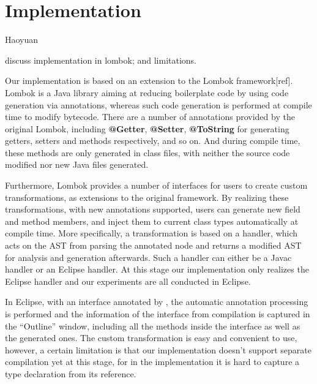 \section{Implementation}
Haoyuan

discuss implementation in lombok; and limitations.





Our implementation is based on an extension to the Lombok framework[ref]. Lombok is a Java library aiming at reducing boilerplate code by using code generation via annotations, whereas such code generation is performed at compile time to modify bytecode. There are a number of annotations provided by the original Lombok, including \textbf{@Getter}, \textbf{@Setter}, \textbf{@ToString} for generating getters, setters and  methods respectively, and so on. And during compile time, these methods are only generated in class files, with neither the source code modified nor new Java files generated.

Furthermore, Lombok provides a number of interfaces for users to create custom transformations, as extensions to the original framework. By realizing these transformations, with new annotations supported, users can generate new field and method members, and inject them to current class types automatically at compile time. More specifically, a transformation is based on a handler, which acts on the AST from parsing the annotated node and returns a modified AST for analysis and generation afterwards. Such a handler can either be a Javac handler or an Eclipse handler. At this stage our implementation only realizes the Eclipse handler and our experiments are all conducted in Eclipse.

In Eclipse, with an interface annotated by \mixin, the automatic annotation processing is performed and the information of the interface from compilation is captured in the ``Outline'' window, including all the methods inside the interface as well as the generated ones. The custom transformation is easy and convenient to use, however, a certain limitation is that our implementation doesn't support separate compilation yet at this stage, for in the implementation it is hard to capture a type declaration from its reference. 